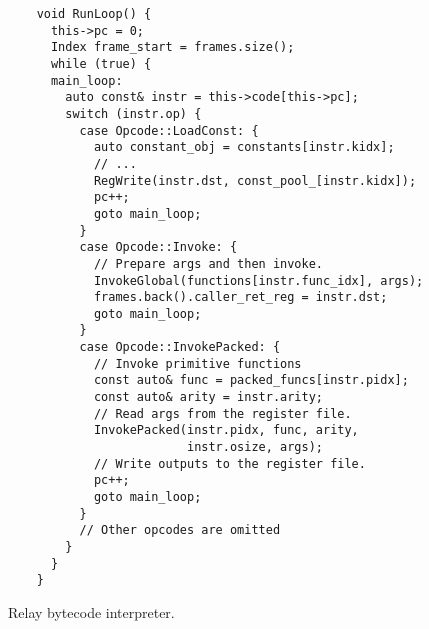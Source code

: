     \begin{figure}[htbp]
    \centering
    \begin{lstlisting}
    void RunLoop() {
      this->pc = 0;
      Index frame_start = frames.size();
      while (true) {
      main_loop:
        auto const& instr = this->code[this->pc];
        switch (instr.op) {
          case Opcode::LoadConst: {
            auto constant_obj = constants[instr.kidx];
            // ...
            RegWrite(instr.dst, const_pool_[instr.kidx]);
            pc++;
            goto main_loop;
          }
          case Opcode::Invoke: {
            // Prepare args and then invoke.
            InvokeGlobal(functions[instr.func_idx], args);
            frames.back().caller_ret_reg = instr.dst;
            goto main_loop;
          }
          case Opcode::InvokePacked: {
            // Invoke primitive functions
            const auto& func = packed_funcs[instr.pidx];
            const auto& arity = instr.arity;
            // Read args from the register file.
            InvokePacked(instr.pidx, func, arity,
                         instr.osize, args);
            // Write outputs to the register file.
            pc++;
            goto main_loop;
          }
          // Other opcodes are omitted
        }
      }
    }
    \end{lstlisting}
    \caption{Relay bytecode interpreter.}
    \label{fig:interpreter}
    \end{figure}
